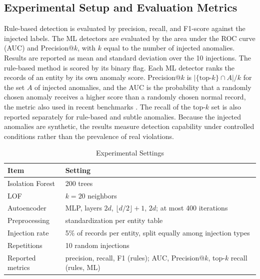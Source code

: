 \documentclass[conference]{IEEEtran}
\begin{document}
\subsection{Experimental Setup and Evaluation Metrics}
Rule-based detection is evaluated by precision, recall, and F1-score against the injected labels. The ML detectors are evaluated by the area under the ROC curve (AUC) and Precision@$k$, with $k$ equal to the number of injected anomalies. Results are reported as mean and standard deviation over the 10 injections. The rule-based method is scored by its binary flag. Each ML detector ranks the records of an entity by its own anomaly score. Precision@$k$ is $|\{\text{top-}k\}\cap A|/k$ for the set $A$ of injected anomalies, and the AUC is the probability that a randomly chosen anomaly receives a higher score than a randomly chosen normal record, the metric also used in recent benchmarks \cite{han2022adbench}. The recall of the top-$k$ set is also reported separately for rule-based and subtle anomalies. Because the injected anomalies are synthetic, the results measure detection capability under controlled conditions rather than the prevalence of real violations.


\begin{table}[htbp]
\caption{Experimental Settings}
\begin{center}
\begin{tabular}{L{0.34\columnwidth}L{0.54\columnwidth}}
\toprule
\textbf{Item} & \textbf{Setting} \\
\midrule
Isolation Forest & 200 trees \\
LOF & $k=20$ neighbors \\
Autoencoder & MLP, layers $2d$, $\lfloor d/2\rfloor+1$, $2d$; at most 400 iterations \\
Preprocessing & standardization per entity table \\
Injection rate & 5\% of records per entity, split equally among injection types \\
Repetitions & 10 random injections \\
Reported metrics & precision, recall, F1 (rules); AUC, Precision@$k$, top-$k$ recall (rules, ML) \\
\bottomrule
\end{tabular}
\label{tab:settings}
\end{center}
\end{table}
\end{document}
